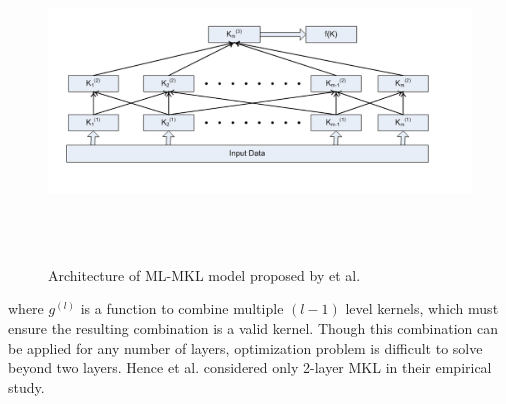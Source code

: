 \begin{figure}
  \centering
  \captionsetup{justification=centering,margin=0.1cm}
  \includegraphics[width=1.1\textwidth,height=8.5cm]{figures/2lmkl}
  \caption{Architecture of ML-MKL model proposed by \cite{2l_mkl} et al.}
  \label{fig_2l_mkl}
\end{figure}

where $g^{(l)}$ is a function to combine multiple $(l-1)$ level kernels, which must ensure the resulting combination is a valid kernel. Though this combination can be applied for any number of layers, optimization problem is difficult to solve beyond two layers. Hence \cite{2l_mkl} et al. considered only 2-layer MKL in their empirical study. 

